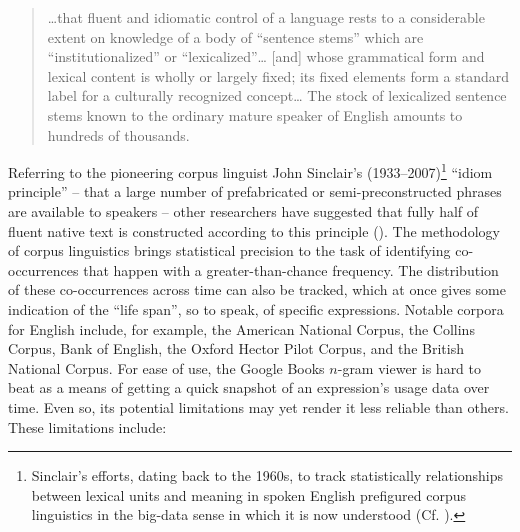 \documentclass[output=paper]{langsci/langscibook}
\begin{document}
\begin{quote}
…that fluent and idiomatic control of a language rests to a considerable extent on knowledge of a body of ``sentence stems'' which are ``institutionalized'' or ``lexicalized''… [and] whose grammatical form and lexical content is wholly or largely fixed; its fixed elements form a standard label for a culturally recognized concept… The stock of lexicalized sentence stems known to the ordinary mature speaker of English amounts to hundreds of thousands.  
\end{quote}

Referring to the pioneering corpus linguist John Sinclair’s (1933--2007)\footnote{Sinclair’s efforts, dating back to the 1960s, to track statistically relationships between lexical units and meaning in spoken English prefigured corpus linguistics in the big-data sense in which it is now understood (Cf. \citealt{chapelle_encyclopedia_2013-1}).} ``idiom principle'' – that a large number of prefabricated or semi-preconstructed phrases are available to speakers – other researchers have suggested that fully half of fluent native text is constructed according to this principle (\citealt[29]{erman_idiom_2000}). The methodology of corpus linguistics brings statistical precision to the task of identifying co-occurrences that happen with a greater-than-chance frequency.  The distribution of these co-occurrences across time can also be tracked, which at once gives some indication of the ``life span'', so to speak, of specific expressions. Notable corpora for English include, for example, the American National Corpus, the Collins Corpus, Bank of English, the Oxford Hector Pilot Corpus, and the British National Corpus. For ease of use, the Google Books $n$-gram viewer is hard to beat as a means of getting a quick snapshot of an expression’s usage data over time.  Even so, its potential limitations may yet render it less reliable than others. These limitations include: 
\end{document}
